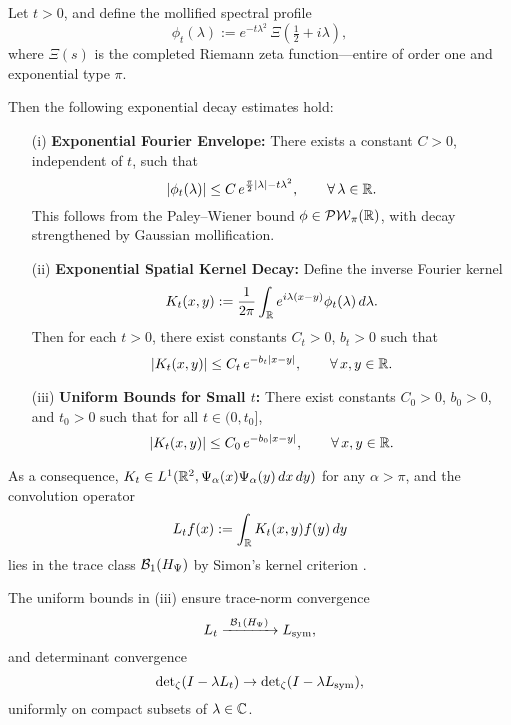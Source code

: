 \begin{lemma}
\label{lem:decay_mollified_kernel}
Let \( t > 0 \), and define the mollified spectral profile
\[
\phi_t(\lambda) := e^{-t\lambda^2} \, \Xi\left(\tfrac{1}{2} + i\lambda\right),
\]
where \( \Xi(s) \) is the completed Riemann zeta function—entire of order one and exponential type \( \pi \).

Then the following exponential decay estimates hold:
\begin{enumerate}
    \item[\textup{(i)}] \textbf{Exponential Fourier Envelope:} There exists a constant \( C > 0 \), independent of \( t \), such that
    \[
    |\phi_t(\lambda)| \le C \, e^{\frac{\pi}{2}|\lambda| - t\lambda^2}, \qquad \forall\, \lambda \in \mathbb{R}.
    \]
    This follows from the Paley--Wiener bound \( \phi \in \mathcal{PW}_{\pi}(\mathbb{R}) \), with decay strengthened by Gaussian mollification.

    \item[\textup{(ii)}] \textbf{Exponential Spatial Kernel Decay:} Define the inverse Fourier kernel
    \[
    K_t(x,y) := \frac{1}{2\pi} \int_{\mathbb{R}} e^{i\lambda(x - y)} \phi_t(\lambda)\,d\lambda.
    \]
    Then for each \( t > 0 \), there exist constants \( C_t > 0 \), \( b_t > 0 \) such that
    \[
    |K_t(x,y)| \le C_t\, e^{-b_t |x - y|}, \qquad \forall\, x, y \in \mathbb{R}.
    \]

    \item[\textup{(iii)}] \textbf{Uniform Bounds for Small \( t \):} There exist constants \( C_0 > 0 \), \( b_0 > 0 \), and \( t_0 > 0 \) such that for all \( t \in (0, t_0] \),
    \[
    |K_t(x,y)| \le C_0\, e^{-b_0 |x - y|}, \qquad \forall\, x, y \in \mathbb{R}.
    \]
\end{enumerate}

\noindent
As a consequence, \( K_t \in L^1(\mathbb{R}^2, \Psi_\alpha(x)\Psi_\alpha(y)\, dx\,dy) \) for any \( \alpha > \pi \), and the convolution operator
\[
L_t f(x) := \int_{\mathbb{R}} K_t(x,y) f(y)\, dy
\]
lies in the trace class \( \mathcal{B}_1(H_{\Psi}) \) by Simon’s kernel criterion \cite[Thm.~4.2]{Simon2005TraceIdeals}.

\medskip
\noindent
The uniform bounds in \textup{(iii)} ensure trace-norm convergence
\[
L_t \xrightarrow{\ \TC(\HPsi)\ } L_{\sym},
\]
and determinant convergence
\[
\det\nolimits_\zeta(I - \lambda L_t) \to \det\nolimits_\zeta(I - \lambda L_{\mathrm{sym}}),
\]
uniformly on compact subsets of \( \lambda \in \mathbb{C} \).
\end{lemma}
